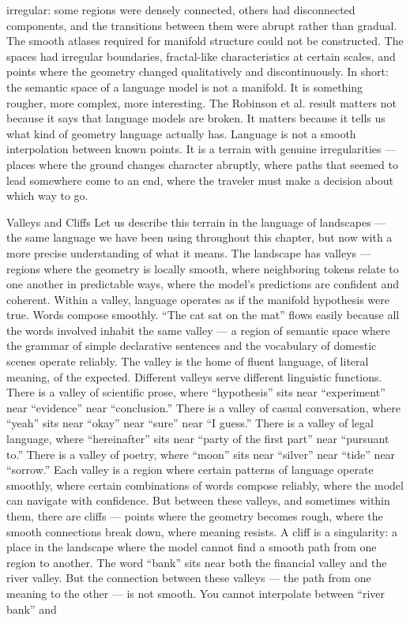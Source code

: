 irregular: some regions were densely connected, others had disconnected components, and the transitions between them were abrupt rather than gradual. The smooth atlases required for manifold structure could not be constructed. The spaces had irregular boundaries, fractal-like characteristics at certain scales, and points where the geometry changed qualitatively and discontinuously. In short: the semantic space of a language model is not a manifold. It is something rougher, more complex, more interesting. The Robinson et al. result matters not because it says that language models are broken. It matters because it tells us what kind of geometry language actually has. Language is not a smooth interpolation between known points. It is a terrain with genuine irregularities — places where the ground changes character abruptly, where paths that seemed to lead somewhere come to an end, where the traveler must make a decision about which way to go.

Valleys and Cliffs Let us describe this terrain in the language of landscapes — the same language we have been using throughout this chapter, but now with a more precise understanding of what it means. The landscape has valleys — regions where the geometry is locally smooth, where neighboring tokens relate to one another in predictable ways, where the model’s predictions are confident and coherent. Within a valley, language operates as if the manifold hypothesis were true. Words compose smoothly. “The cat sat on the mat” flows easily because all the words involved inhabit the same valley — a region of semantic space where the grammar of simple declarative sentences and the vocabulary of domestic scenes operate reliably. The valley is the home of fluent language, of literal meaning, of the expected. Different valleys serve different linguistic functions. There is a valley of scientific prose, where “hypothesis” sits near “experiment” near “evidence” near “conclusion.” There is a valley of casual conversation, where “yeah” sits near “okay” near “sure” near “I guess.” There is a valley of legal language, where “hereinafter” sits near “party of the first part” near “pursuant to.” There is a valley of poetry, where “moon” sits near “silver” near “tide” near “sorrow.” Each valley is a region where certain patterns of language operate smoothly, where certain combinations of words compose reliably, where the model can navigate with confidence. But between these valleys, and sometimes within them, there are cliffs — points where the geometry becomes rough, where the smooth connections break down, where meaning resists. A cliff is a singularity: a place in the landscape where the model cannot find a smooth path from one region to another. The word “bank” sits near both the financial valley and the river valley. But the connection between these valleys — the path from one meaning to the other — is not smooth. You cannot interpolate between “river bank” and

